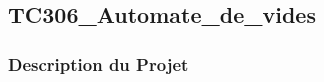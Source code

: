 \documentclass[a4paper,12pt]{report}
\begin{document}
\subsection{TC306\_Automate\_de\_vides}
\begin{center}
\label{}
\end{center}

\subsubsection{Description du Projet}
\end{document}
